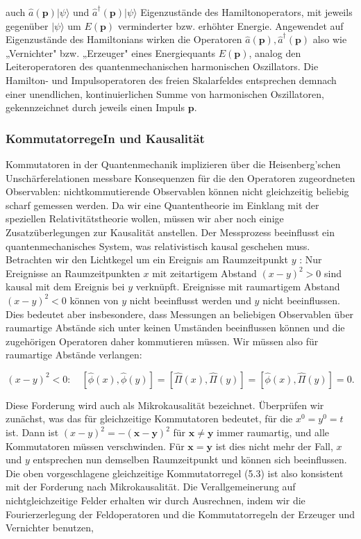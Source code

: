 \documentclass[10pt, letterpaper]{article}
\begin{document}
auch $\hat{a}(\mathbf{p})|\psi\rangle$ und $\hat{a}^{\dagger}(\mathbf{p})|\psi\rangle$ Eigenzustände des Hamiltonoperators, mit jeweils gegenüber $|\psi\rangle$ um $E(\mathbf{p})$ verminderter bzw. erhöhter Energie. Angewendet auf Eigenzustände des Hamiltonians wirken die Operatoren $\hat{a}(\mathbf{p}), \hat{a}^{\dagger}(\mathbf{p})$ also wie „Vernichter" bzw. „Erzeuger" eines Energiequants $E(\mathbf{p})$, analog den Leiteroperatoren des quantenmechanischen harmonischen Oszillators. Die Hamilton- und Impulsoperatoren des freien Skalarfeldes entsprechen demnach einer unendlichen, kontinuierlichen Summe von harmonischen Oszillatoren, gekennzeichnet durch jeweils einen Impuls $\mathbf{p}$.

\subsubsection*{KommutatorregeIn und Kausalität}
Kommutatoren in der Quantenmechanik implizieren über die Heisenberg'schen Unschärferelationen messbare Konsequenzen für die den Operatoren zugeordneten Observablen: nichtkommutierende Observablen können nicht gleichzeitig beliebig scharf gemessen werden. Da wir eine Quantentheorie im Einklang mit der speziellen Relativitätstheorie wollen, müssen wir aber noch einige Zusatzüberlegungen zur Kausalität anstellen. Der Messprozess beeinflusst ein quantenmechanisches System, was relativistisch kausal geschehen muss. Betrachten wir den Lichtkegel um ein Ereignis am Raumzeitpunkt $y$ : Nur Ereignisse an Raumzeitpunkten $x$ mit zeitartigem Abstand $(x-y)^{2}>0$ sind kausal mit dem Ereignis bei $y$ verknüpft. Ereignisse mit raumartigem Abstand $(x-y)^{2}<0$ können von $y$ nicht beeinflusst werden und $y$ nicht beeinflussen. Dies bedeutet aber insbesondere, dass Messungen an beliebigen Observablen über raumartige Abstände sich unter keinen Umständen beeinflussen können und die zugehörigen Operatoren daher kommutieren müssen. Wir müssen also für raumartige Abstände verlangen:

$$
(x-y)^{2}<0: \quad[\hat{\phi}(x), \hat{\phi}(y)]=[\hat{\Pi}(x), \hat{\Pi}(y)]=[\hat{\phi}(x), \hat{\Pi}(y)]=0 .
$$

Diese Forderung wird auch als Mikrokausalität bezeichnet. Überprüfen wir zunächst, was das für gleichzeitige Kommutatoren bedeutet, für die $x^{0}=y^{0}=t$ ist. Dann ist $(x-y)^{2}=-(\mathbf{x}-\mathbf{y})^{2}$ für $\mathbf{x} \neq \mathbf{y}$ immer raumartig, und alle Kommutatoren müssen verschwinden. Für $\mathbf{x}=\mathbf{y}$ ist dies nicht mehr der Fall, $x$ und $y$ entsprechen nun demselben Raumzeitpunkt und können sich beeinflussen. Die oben vorgeschlagene gleichzeitige Kommutatorregel (5.3) ist also konsistent mit der Forderung nach Mikrokausalität. Die Verallgemeinerung auf nichtgleichzeitige Felder erhalten wir durch Ausrechnen, indem wir die Fourierzerlegung der Feldoperatoren und die Kommutatorregeln der Erzeuger und Vernichter benutzen,
\end{document}
